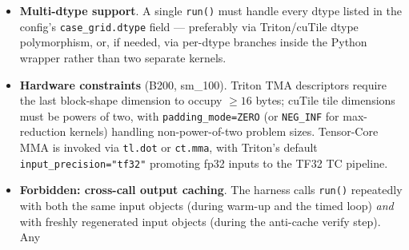 \documentclass[11pt]{article}
\begin{document}
\begin{itemize}[leftmargin=*]
\begin{itemize}[leftmargin=*, itemsep=2pt]
        $\geq 256$ along the reduction axis; stencil / 2D conv $\geq 256$
        along the spatial inner axis; matmul / attention tile
        $\texttt{BLOCK\_M}, \texttt{BLOCK\_N} \geq 64$ and
        $\texttt{BLOCK\_K} \geq 32$ for Tensor-Core utilisation.
        \item Upper bounds: $\texttt{BLOCK\_SIZE} \leq 8192$ for
        fp16/fp32 pointwise ($\leq 16384$ for int8); matmul tile area
        $\texttt{BLOCK\_M} \times \texttt{BLOCK\_N} \leq 256 \times 256$
        for fp16/fp8/int8 ($\leq 128 \times 256$ for fp32 due to
        register pressure); $\texttt{BLOCK\_K} \leq 128$ for
        fp16/fp8/int8 ($\leq 64$ for fp32).
        \item Recommended sweep ranges (a starting point that fits in
        the 30-config budget): pointwise
        $\texttt{BLOCK\_SIZE} \in \{512, 1024, 2048, 4096\}$;
        per-row reduction
        $\texttt{BLOCK\_N} \in \{256, 512, 1024, 2048\}$;
        matmul
        $\texttt{BLOCK\_M}, \texttt{BLOCK\_N} \in \{64, 128, 256\}$,
        $\texttt{BLOCK\_K} \in \{32, 64, 128\}$. cuTile uses
        \texttt{tile}, \texttt{tm}, \texttt{tn}, \texttt{tk}, and
        \texttt{occupancy} as the analogous knobs (with
        $\texttt{num\_warps} \times \texttt{occupancy} \approx 64$ on
        B200).
    \end{itemize}
    \item \textbf{Multi-dtype support}. A single \texttt{run()} must
    handle every dtype listed in the config's \texttt{case\_grid.dtype}
    field --- preferably via Triton/cuTile dtype polymorphism, or, if
    needed, via per-dtype branches inside the Python wrapper rather
    than two separate kernels.
    \item \textbf{Hardware constraints} (B200, sm\_100). Triton TMA
    descriptors require the last block-shape dimension to occupy
    $\geq 16$ bytes; cuTile tile dimensions must be powers of two,
    with \texttt{padding\_mode=ZERO} (or \texttt{NEG\_INF} for
    max-reduction kernels) handling non-power-of-two problem sizes.
    Tensor-Core MMA is invoked via \texttt{tl.dot} or \texttt{ct.mma},
    with Triton's default \texttt{input\_precision="tf32"} promoting
    fp32 inputs to the TF32 TC pipeline.
    \item \textbf{Forbidden: cross-call output caching}. The harness
    calls \texttt{run()} repeatedly with both the same input objects
    (during warm-up and the timed loop) \emph{and} with freshly
    regenerated input objects (during the anti-cache verify step). Any

\end{itemize}
\end{document}
